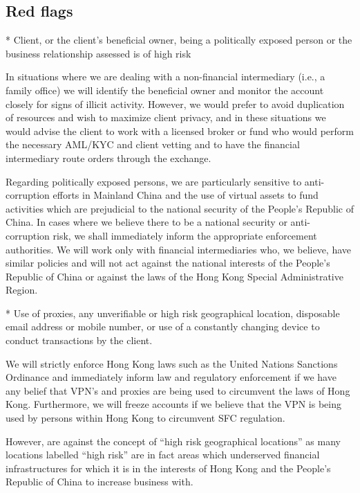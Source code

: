 
\subsection{Red flags}

* Client, or the client’s beneficial owner, being a politically
exposed person or the business relationship assessed is of high risk

In situations where we are dealing with a non-financial intermediary
(i.e., a family office) we will identify the beneficial owner and
monitor the account closely for signs of illicit activity.  However,
we would prefer to avoid duplication of resources and wish to maximize
client privacy, and in these situations we would advise the client to
work with a licensed broker or fund who would perform the necessary
AML/KYC and client vetting and to have the financial intermediary
route orders through the exchange.

Regarding politically exposed persons, we are particularly
sensitive to anti-corruption efforts in Mainland China and the use of
virtual assets to fund activities which are prejudicial to the
national security of the People's Republic of China.  In cases where
we believe there to be a national security or anti-corruption risk, we
shall immediately inform the appropriate enforcement authorities.  We
will work only with financial intermediaries who, we believe, have
similar policies and will not act against the national interests of
the People's Republic of China or against the laws of the Hong Kong
Special Administrative Region.

* Use of proxies, any unverifiable or high risk geographical location,
disposable email address or mobile number, or use of a constantly
changing device to conduct transactions by the client.

We will strictly enforce Hong Kong laws such as the United Nations
Sanctions Ordinance and immediately inform law and regulatory
enforcement if we have any belief that VPN's and proxies are being
used to circumvent the laws of Hong Kong.  Furthermore, we will freeze
accounts if we believe that the VPN is being used by persons within
Hong Kong to circumvent SFC regulation.

However, are against the concept of ``high risk geographical
locations'' as many locations labelled ``high risk'' are in fact areas
which underserved financial infrastructures for which it is in the
interests of Hong Kong and the People's Republic of China to increase
business with.

